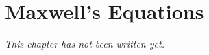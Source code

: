 \chapter{Maxwell's Equations}\label{ch:b2:maxwell-equations}


\emph{This chapter has not been written yet.}
